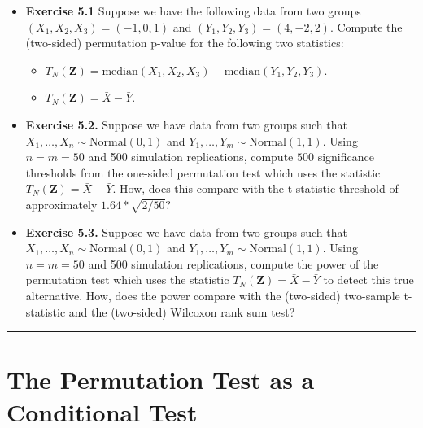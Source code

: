 \documentclass[]{book}
\providecommand{\tightlist}{%
  \setlength{\itemsep}{0pt}\setlength{\parskip}{0pt}}
\begin{document}
\begin{itemize}
\item
  \textbf{Exercise 5.1} Suppose we have the following data from two groups
  \((X_{1}, X_{2}, X_{3}) = (-1, 0, 1)\) and \((Y_{1}, Y_{2}, Y_{3}) = (4, -2, 2)\).
  Compute the (two-sided) permutation p-value for the following two statistics:

  \begin{itemize}
  \tightlist
  \item
    \(T_{N}( \mathbf{Z} ) = \textrm{median}(X_{1}, X_{2}, X_{3}) - \textrm{median}(Y_{1}, Y_{2}, Y_{3})\).
  \item
    \(T_{N}( \mathbf{Z} ) = \bar{X} - \bar{Y}\).
  \end{itemize}
\item
  \textbf{Exercise 5.2.} Suppose we have data from two groups
  such that \(X_{1}, \ldots, X_{n} \sim \textrm{Normal}(0, 1)\) and
  \(Y_{1}, \ldots, Y_{m} \sim \textrm{Normal}(1, 1)\). Using
  \(n=m=50\) and 500 simulation replications, compute
  \(500\) significance thresholds from the one-sided permutation
  test which uses the statistic \(T_{N}( \mathbf{Z} ) = \bar{X} - \bar{Y}\).
  How, does this compare with the t-statistic threshold of
  approximately \(1.64*\sqrt{2/50}\)?
\item
  \textbf{Exercise 5.3.} Suppose we have data from two groups
  such that \(X_{1}, \ldots, X_{n} \sim \textrm{Normal}(0, 1)\) and
  \(Y_{1}, \ldots, Y_{m} \sim \textrm{Normal}(1, 1)\). Using
  \(n=m=50\) and 500 simulation replications, compute the power of
  the permutation test which uses the statistic
  \(T_{N}( \mathbf{Z} ) = \bar{X} - \bar{Y}\) to detect this true alternative.
  How, does the power compare with the (two-sided) two-sample t-statistic and
  the (two-sided) Wilcoxon rank sum test?
\end{itemize}

\begin{center}\rule{0.5\linewidth}{\linethickness}\end{center}

\hypertarget{the-permutation-test-as-a-conditional-test}{%
\section{The Permutation Test as a Conditional Test}\label{the-permutation-test-as-a-conditional-test}}
\end{document}
